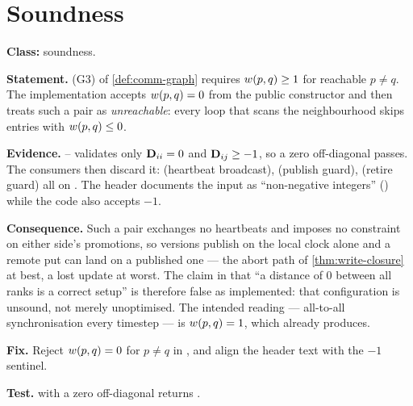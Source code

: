 \clearpage

\section{Soundness}

\begin{deviation}\label{dev:zero-distance}
\textbf{Class:} soundness.

\textbf{Statement.} (G3) of \cref{def:comm-graph} requires
$w(p,q)\ge 1$ for reachable $p \ne q$. The implementation accepts
$w(p,q)=0$ from the public constructor and then treats such a pair as
\emph{unreachable}: every loop that scans the \gls{neighbourhood} skips entries with
$w(p,q) \le 0$.

\textbf{Evidence.} -- validates
only $\mathbf{D}_{ii}=0$ and $\mathbf{D}_{ij}\ge-1$, so a zero off-diagonal passes. The
consumers then discard it:  (heartbeat broadcast),
 (publish guard),  (retire guard) all
 on . The header documents the input as
``non-negative integers'' () while the code also accepts
$-1$.

\textbf{Consequence.} Such a pair exchanges no \glspl{heartbeat} and imposes
no constraint on either side's promotions, so \glspl{version} publish on the
local clock alone and a remote put can land on a published one --- the abort
path of \cref{thm:write-closure} at best, a lost update at worst. The claim in
\cite{dstm2026} that ``a distance of 0 between all \glspl{rank} is a correct
setup'' is therefore false as implemented: that configuration is unsound, not
merely unoptimised. The intended reading --- all-to-all synchronisation every
timestep --- is $w(p,q)=1$, which 
already produces.

\textbf{Fix.} Reject $w(p,q)=0$ for $p \ne q$ in
, and align the header text with
the $-1$ sentinel.

\textbf{Test.}  with a zero off-diagonal returns
.
\end{deviation}

